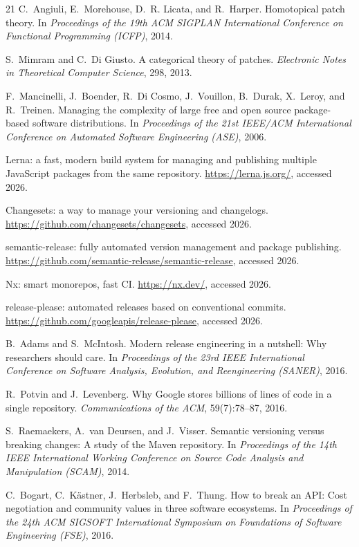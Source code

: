 \documentclass[sigconf,nonacm]{acmart}
\theoremstyle{acmplain}
\theoremstyle{acmdefinition}
\theoremstyle{acmplain}
\begin{document}
\begin{thebibliography}{21}
C.~Angiuli, E.~Morehouse, D.~R. Licata, and R.~Harper.
Homotopical patch theory.
In \emph{Proceedings of the 19th ACM SIGPLAN International Conference
on Functional Programming (ICFP)}, 2014.

S.~Mimram and C.~Di Giusto.
A categorical theory of patches.
\emph{Electronic Notes in Theoretical Computer Science}, 298, 2013.

F.~Mancinelli, J.~Boender, R.~Di Cosmo, J.~Vouillon, B.~Durak,
X.~Leroy, and R.~Treinen.
Managing the complexity of large free and open source package-based
software distributions.
In \emph{Proceedings of the 21st IEEE/ACM International Conference on
Automated Software Engineering (ASE)}, 2006.

Lerna: a fast, modern build system for managing and publishing multiple
JavaScript packages from the same repository.
\url{https://lerna.js.org/}, accessed 2026.

Changesets: a way to manage your versioning and changelogs.
\url{https://github.com/changesets/changesets}, accessed 2026.

semantic-release: fully automated version management and package
publishing.
\url{https://github.com/semantic-release/semantic-release},
accessed 2026.

Nx: smart monorepos, fast CI.
\url{https://nx.dev/}, accessed 2026.

release-please: automated releases based on conventional commits.
\url{https://github.com/googleapis/release-please}, accessed 2026.

B.~Adams and S.~McIntosh.
Modern release engineering in a nutshell: Why researchers should care.
In \emph{Proceedings of the 23rd IEEE International Conference on
Software Analysis, Evolution, and Reengineering (SANER)}, 2016.

R.~Potvin and J.~Levenberg.
Why Google stores billions of lines of code in a single repository.
\emph{Communications of the ACM}, 59(7):78--87, 2016.

S.~Raemaekers, A.~van Deursen, and J.~Visser.
Semantic versioning versus breaking changes: A study of the Maven
repository.
In \emph{Proceedings of the 14th IEEE International Working Conference
on Source Code Analysis and Manipulation (SCAM)}, 2014.

C.~Bogart, C.~K\"astner, J.~Herbsleb, and F.~Thung.
How to break an API: Cost negotiation and community values in three
software ecosystems.
In \emph{Proceedings of the 24th ACM SIGSOFT International Symposium on
Foundations of Software Engineering (FSE)}, 2016.


\end{thebibliography}
\end{document}
